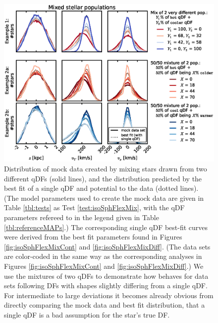 

\begin{figure}[!htbp]
\centering
\includegraphics[width=\columnwidth]{figs/isoSphFlexMix_mockdata_residuals_2.eps}
\caption{Distribution of mock data created by mixing stars drawn from two different qDFs (solid lines), and the distribution predicted by the best fit of a single qDF and potential to the data (dotted lines). (The model parameters used to create the mock data are given in Table \ref{tbl:tests} as Test \ref{test:isoSphFlexMix}, with the qDF parameters refereed to in the legend given in Table \ref{tbl:referenceMAPs}.) The corresponding single qDF best-fit curves were derived from the best fit parameters found in Figures \ref{fig:isoSphFlexMixCont} and \ref{fig:isoSphFlexMixDiff}. (The data sets are color-coded in the same way as the corresponding analyses in Figures  \ref{fig:isoSphFlexMixCont} and \ref{fig:isoSphFlexMixDiff}.) We use the mixtures of two qDFs to demonstrate how \RM{} behaves for data sets following DFs with shapes slightly differing from a single qDF. For intermediate to large deviations it becomes already obvious from directly comparing the mock data and best fit distribution, that a single qDF is a bad assumption for the star's true DF.  }
\label{fig:isoSphFlexMix_mockdata_residuals}
\end{figure}

